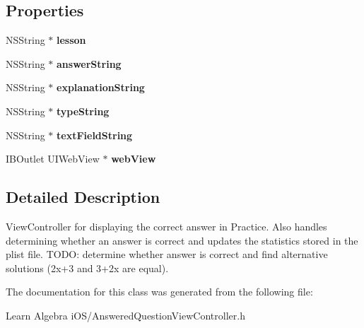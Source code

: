 \subsection*{Properties}
\begin{DoxyCompactItemize}
\item 
\hypertarget{interface_answered_question_view_controller_a020e784146a3017ac9631e064ddd63ac}{N\-S\-String $\ast$ {\bfseries lesson}}\label{interface_answered_question_view_controller_a020e784146a3017ac9631e064ddd63ac}

\item 
\hypertarget{interface_answered_question_view_controller_a13f9c2ff12e93a9a5097c990ec6d5b79}{N\-S\-String $\ast$ {\bfseries answer\-String}}\label{interface_answered_question_view_controller_a13f9c2ff12e93a9a5097c990ec6d5b79}

\item 
\hypertarget{interface_answered_question_view_controller_a8d8e674f02def79f8d0f9d75acd02f3f}{N\-S\-String $\ast$ {\bfseries explanation\-String}}\label{interface_answered_question_view_controller_a8d8e674f02def79f8d0f9d75acd02f3f}

\item 
\hypertarget{interface_answered_question_view_controller_a63431952a0ce4ad64771056afba55ed7}{N\-S\-String $\ast$ {\bfseries type\-String}}\label{interface_answered_question_view_controller_a63431952a0ce4ad64771056afba55ed7}

\item 
\hypertarget{interface_answered_question_view_controller_a71261921bfeff45ec512a9100c6d917c}{N\-S\-String $\ast$ {\bfseries text\-Field\-String}}\label{interface_answered_question_view_controller_a71261921bfeff45ec512a9100c6d917c}

\item 
\hypertarget{interface_answered_question_view_controller_ac3d5a293f93344203bcc93c38bcd5282}{I\-B\-Outlet U\-I\-Web\-View $\ast$ {\bfseries web\-View}}\label{interface_answered_question_view_controller_ac3d5a293f93344203bcc93c38bcd5282}

\end{DoxyCompactItemize}


\subsection{Detailed Description}
View\-Controller for displaying the correct answer in Practice. Also handles determining whether an answer is correct and updates the statistics stored in the plist file. T\-O\-D\-O\-: determine whether answer is correct and find alternative solutions (2x+3 and 3+2x are equal). 

The documentation for this class was generated from the following file\-:\begin{DoxyCompactItemize}
\item 
Learn Algebra i\-O\-S/Answered\-Question\-View\-Controller.\-h\end{DoxyCompactItemize}
